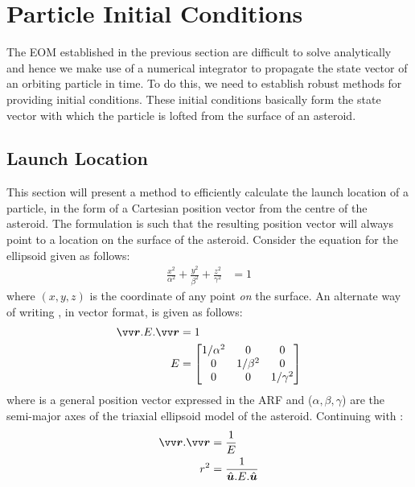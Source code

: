 \section{Particle Initial Conditions}
\label{sec:init_conditions}
The \gls{EOM} established in the previous section are difficult to solve analytically and hence we make use of a numerical integrator to propagate the state vector of an orbiting particle in time. To do this, we need to establish robust methods for providing initial conditions. These initial conditions basically form the state vector with which the particle is lofted from the surface of an asteroid.

\subsection{Launch Location}
\label{subsec:launch_location}
This section will present a method to efficiently calculate the launch location of a particle, in the form of a Cartesian position vector from the centre of the asteroid. The formulation is such that the resulting position vector will always point to a location on the surface of the asteroid.
%
\newline\newline
%
Consider the equation for the ellipsoid given as follows:
\begin{align}
    \frac{x^2}{\alpha^2} + \frac{y^2}{\beta^2} + \frac{z^2}{\gamma^2} &= 1
    \label{eqn:launch_loc_ellipsoid_eqn_cartesian}
\end{align}
where $(x,y,z)$ is the coordinate of any point \emph{on} the surface. An alternate way of writing , in vector format, is given as follows:
\begin{align}
    \bv{r}.E.\bv{r} &= 1
    \label{eqn:launch_loc_ellipsoid_eqn_vectorForm} \\
    E &=
    \begin{bmatrix}
        1/\alpha^2 & 0 & 0 \\
        0 & 1/\beta^2 & 0 \\
        0 & 0 & 1/\gamma^2
    \end{bmatrix}
\end{align}
where  is a general position vector expressed in the \gls{ARF} and ($\alpha, \beta, \gamma$) are the semi-major axes of the triaxial ellipsoid model of the asteroid. Continuing with :
\begin{align}
    \bv{r}.\bv{r} &= \frac{1}{E} \\
    r^2 &= \frac{1}{\buvec{u}.E.\buvec{u}}
    \label{eqn:launch_loc_r_square}
\end{align}
